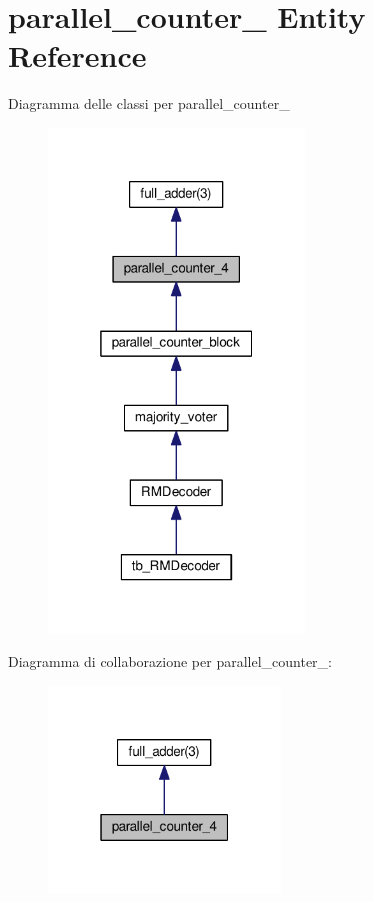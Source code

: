 \hypertarget{classparallel__counter__4}{\section{parallel\+\_\+counter\+\_ Entity Reference}
\label{classparallel__counter__4}
}


Diagramma delle classi per parallel\+\_\+counter\+\_\nopagebreak
\begin{figure}[H]
\begin{center}
\leavevmode
\includegraphics[width=193pt]{classparallel__counter__4__inherit__graph}
\end{center}
\end{figure}


Diagramma di collaborazione per parallel\+\_\+counter\+\_\+:\nopagebreak
\begin{figure}[H]
\begin{center}
\leavevmode
\includegraphics[width=175pt]{classparallel__counter__4__coll__graph}
\end{center}
\end{figure}
